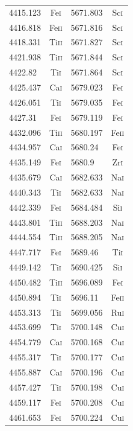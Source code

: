 \begin{longtable}[c]{|l|c|l|c|}
4415.123 & Fe\textsc{i} & 5671.803 & Sc\textsc{i}\\  
4416.818 & Fe\textsc{ii} & 5671.816 & Sc\textsc{i}\\ 
4418.331 & Ti\textsc{ii} & 5671.827 & Sc\textsc{i}\\ 
4421.938 & Ti\textsc{ii} & 5671.844 & Sc\textsc{i}\\ 
4422.82 & Ti\textsc{i} & 5671.864 & Sc\textsc{i}\\   
4425.437 & Ca\textsc{i} & 5679.023 & Fe\textsc{i}\\  
4426.051 & Ti\textsc{i} & 5679.035 & Fe\textsc{i}\\  
4427.31 & Fe\textsc{i} & 5679.119 & Fe\textsc{i}\\   
4432.096 & Ti\textsc{ii} & 5680.197 & Fe\textsc{ii}\\
4434.957 & Ca\textsc{i} & 5680.24 & Fe\textsc{i}\\   
4435.149 & Fe\textsc{i} & 5680.9 & Zr\textsc{i}\\    
4435.679 & Ca\textsc{i} & 5682.633 & Na\textsc{i}\\  
4440.343 & Ti\textsc{i} & 5682.633 & Na\textsc{i}\\  
4442.339 & Fe\textsc{i} & 5684.484 & Si\textsc{i}\\  
4443.801 & Ti\textsc{ii} & 5688.203 & Na\textsc{i}\\ 
4444.554 & Ti\textsc{ii} & 5688.205 & Na\textsc{i}\\ 
4447.717 & Fe\textsc{i} & 5689.46 & Ti\textsc{i}\\   
4449.142 & Ti\textsc{i} & 5690.425 & Si\textsc{i}\\  
4450.482 & Ti\textsc{ii} & 5696.089 & Fe\textsc{i}\\ 
4450.894 & Ti\textsc{i} & 5696.11 & Fe\textsc{ii}\\  
4453.313 & Ti\textsc{i} & 5699.056 & Ru\textsc{i}\\  
4453.699 & Ti\textsc{i} & 5700.148 & Cu\textsc{i}\\  
4454.779 & Ca\textsc{i} & 5700.168 & Cu\textsc{i}\\  
4455.317 & Ti\textsc{i} & 5700.177 & Cu\textsc{i}\\  
4455.887 & Ca\textsc{i} & 5700.196 & Cu\textsc{i}\\  
4457.427 & Ti\textsc{i} & 5700.198 & Cu\textsc{i}\\  
4459.117 & Fe\textsc{i} & 5700.208 & Cu\textsc{i}\\  
4461.653 & Fe\textsc{i} & 5700.224 & Cu\textsc{i}\\  

\end{longtable}
